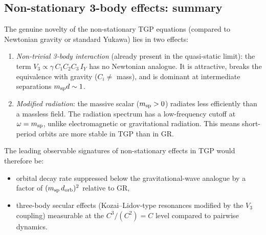 \subsection{Non-stationary 3-body effects: summary}

The genuine novelty of the non-stationary TGP equations (compared to
Newtonian gravity or standard Yukawa) lies in two effects:

\begin{enumerate}
\item \emph{Non-trivial 3-body interaction} (already present in the
  quasi-static limit): the term $V_3 \propto \gamma\,C_1 C_2 C_3\,I_Y$
  has no Newtonian analogue.  It is attractive, breaks the equivalence
  with gravity ($C_i\ne$ mass), and is dominant at intermediate separations
  $m_{\rm sp}d\sim 1$.

\item \emph{Modified radiation}: the massive scalar ($m_{\rm sp}>0$) radiates
  less efficiently than a massless field.  The radiation spectrum has a
  low-frequency cutoff at $\omega = m_{\rm sp}$, unlike electromagnetic or
  gravitational radiation.  This means short-period orbits are more
  stable in TGP than in GR.
\end{enumerate}

The leading observable signatures of non-stationary effects in TGP
would therefore be:
\begin{itemize}
  \item orbital decay rate suppressed below the gravitational-wave analogue
    by a factor of $(m_{\rm sp}\,d_{\rm orb})^2$ relative to GR,
  \item three-body secular effects (Kozai--Lidov-type resonances modified
    by the $V_3$ coupling) measurable at the $C^3/(C^2)=C$ level compared
    to pairwise dynamics.
\end{itemize}
